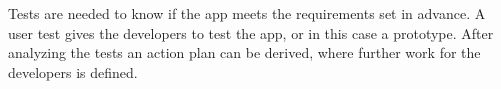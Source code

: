 Tests are needed to know if the app meets the requirements set in advance. A user test gives the developers to test the app, or in this case a prototype. After analyzing the tests an action plan can be derived, where further work for the developers is defined.